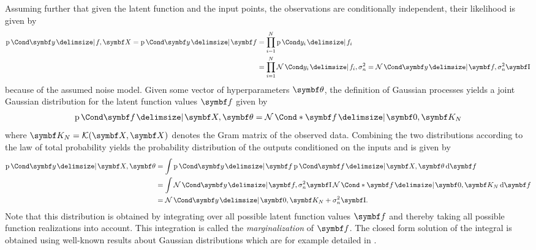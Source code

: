 Assuming further that given the latent function and the input points, the observations are conditionally independent, their likelihood is given by
\begin{align}
    \begin{split}
        \Prob{\mat{y} \given f, \mat{X}} = \Prob{\mat{y} \given \mat{f}} &= \prod_{i = 1}^N \Prob{y_i \given f_i} \\
        &= \prod_{i = 1}^N \Gaussian{y_i \given f_i, \sigma_n^2} = \Gaussian{\mat{y} \given \mat{f}, \sigma_n^2 \Eye}
    \end{split}
\end{align}
because of the assumed noise model.
Given some vector of hyperparameters $\mat{\theta}$, the definition of Gaussian processes yields a joint Gaussian distribution for the latent function values $\mat{f}$ given by
\begin{align}
    \Prob{\mat{f} \given \mat{X}, \mat{\theta}} = \Gaussian*{\mat{f} \given \mat{0}, \mat{K_N}}
\end{align}
where $\mat{K_N} = \K(\mat{X}, \mat{X})$ denotes the Gram matrix of the observed data.
Combining the two distributions according to the law of total probability yields the probability distribution of the outputs conditioned on the inputs and is given by
\begin{align}
    \begin{split}
        \label{eq:gp_marginal_likelihood}
        \Prob{\mat{y} \given \mat{X}, \mat{\theta}} &= \int \Prob{\mat{y} \given \mat{f}} \Prob{\mat{f} \given \mat{X}, \mat{\theta}} \diff \mat{f} \\
        &= \int \Gaussian{\mat{y} \given \mat{f}, \sigma_n^2 \Eye} \Gaussian*{\mat{f} \given \mat{0}, \mat{K_N}} \diff \mat{f} \\
        &= \Gaussian{\mat{y} \given \mat{0}, \mat{K_N} + \sigma_n^2 \Eye}.
    \end{split}
\end{align}
Note that this distribution is obtained by integrating over all possible latent function values $\mat{f}$ and thereby taking all possible function realizations into account.
This integration is called the \emph{marginalization} of $\mat{f}$.
The closed form solution of the integral is obtained using well-known results about Gaussian distributions which are for example detailed in \cite{petersen_matrix_2008}.

